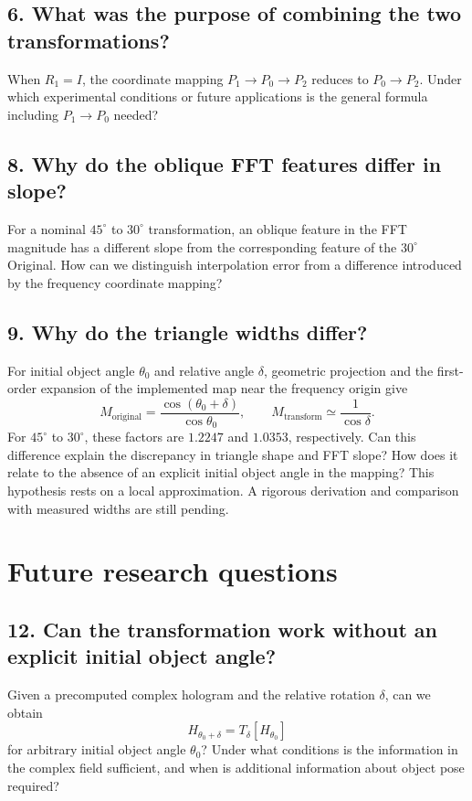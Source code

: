 \documentclass[a4paper,10pt]{article}
\begin{document}
\subsection*{6. What was the purpose of combining the two transformations?}
When $R_1=I$, the coordinate mapping $P_1\to P_0\to P_2$ reduces to $P_0\to P_2$. Under which experimental conditions or future applications is the general formula including $P_1\to P_0$ needed?

\subsection*{8. Why do the oblique FFT features differ in slope?}
For a nominal $45^\circ$ to $30^\circ$ transformation, an oblique feature in the FFT magnitude has a different slope from the corresponding feature of the $30^\circ$ Original. How can we distinguish interpolation error from a difference introduced by the frequency coordinate mapping?

\subsection*{9. Why do the triangle widths differ?}
For initial object angle $\theta_0$ and relative angle $\delta$, geometric projection and the first-order expansion of the implemented map near the frequency origin give
\[
 M_{\mathrm{original}}=\frac{\cos(\theta_0+\delta)}{\cos\theta_0},
 \qquad M_{\mathrm{transform}}\simeq\frac{1}{\cos\delta}.
\]
For $45^\circ$ to $30^\circ$, these factors are $1.2247$ and $1.0353$, respectively. Can this difference explain the discrepancy in triangle shape and FFT slope? How does it relate to the absence of an explicit initial object angle in the mapping? This hypothesis rests on a local approximation. A rigorous derivation and comparison with measured widths are still pending.

\section{Future research questions}
\subsection*{12. Can the transformation work without an explicit initial object angle?}
Given a precomputed complex hologram and the relative rotation $\delta$, can we obtain
\[
 H_{\theta_0+\delta}=T_\delta[H_{\theta_0}]
\]
for arbitrary initial object angle $\theta_0$? Under what conditions is the information in the complex field sufficient, and when is additional information about object pose required?
\end{document}
